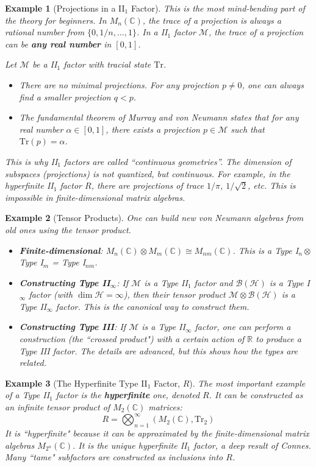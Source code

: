 \documentclass[11pt, a4paper]{article}
\theoremstyle{colored_def}
\theoremstyle{colored_thm}
\theoremstyle{colored_ex}
\newtheorem{example}{Example}[section]
\newcommand{\C}{\mathbb{C}}
\newcommand{\R}{\mathbb{R}}
\newcommand{\Tr}{\text{Tr}}
\newcommand{\M}{\mathcal{M}}
\newcommand{\Hil}{\mathcal{H}}
\newcommand{\B}{\mathcal{B}}
\begin{document}
\begin{example}[Projections in a II$_1$ Factor]\label{ex:proj-ii1}
This is the most mind-bending part of the theory for beginners. In $M_n(\C)$, the trace of a projection is always a rational number from $\{0, 1/n, \dots, 1\}$. In a II$_1$ factor $\M$, the trace of a projection can be \textbf{any real number} in $[0,1]$.

Let $\M$ be a II$_1$ factor with tracial state $\Tr$.
\begin{itemize}
    \item There are no minimal projections. For any projection $p \neq 0$, one can always find a smaller projection $q < p$.
    \item The fundamental theorem of Murray and von Neumann states that for any real number $\alpha \in [0,1]$, there exists a projection $p \in \M$ such that $\Tr(p) = \alpha$.
\end{itemize}
This is why II$_1$ factors are called ``continuous geometries''. The dimension of subspaces (projections) is not quantized, but continuous. For example, in the hyperfinite II$_1$ factor $R$, there are projections of trace $1/\pi$, $1/\sqrt{2}$, etc. This is impossible in finite-dimensional matrix algebras.
\end{example}

\begin{example}[Tensor Products]\label{ex:tensor-product}
One can build new von Neumann algebras from old ones using the tensor product.
\begin{itemize}
    \item \textbf{Finite-dimensional}: $M_n(\C) \otimes M_m(\C) \cong M_{nm}(\C)$. This is a Type I$_n \otimes$ Type I$_m$ = Type I$_{nm}$.
    \item \textbf{Constructing Type II$_{\infty}$}: If $\M$ is a Type II$_1$ factor and $\B(\Hil)$ is a Type I$_{\infty}$ factor (with $\dim \Hil = \infty$), then their tensor product $\M \otimes \B(\Hil)$ is a Type II$_{\infty}$ factor. This is the canonical way to construct them.
    \item \textbf{Constructing Type III}: If $\M$ is a Type II$_{\infty}$ factor, one can perform a construction (the ``crossed product") with a certain action of $\R$ to produce a Type III factor. The details are advanced, but this shows how the types are related.
\end{itemize}
\end{example}

\begin{example}[The Hyperfinite Type II$_1$ Factor, $R$]
The most important example of a Type II$_1$ factor is the \textbf{hyperfinite} one, denoted $R$. It can be constructed as an infinite tensor product of $M_2(\C)$ matrices:
$$ R = \bigotimes_{n=1}^\infty (M_2(\C), \Tr_2) $$
It is ``hyperfinite" because it can be approximated by the finite-dimensional matrix algebras $M_{2^n}(\C)$. It is the unique hyperfinite II$_1$ factor, a deep result of Connes. Many ``tame" subfactors are constructed as inclusions into $R$.
\end{example}
\end{document}
